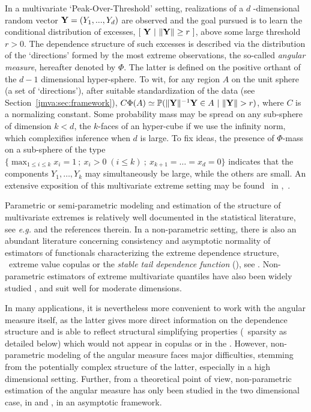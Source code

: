 In a multivariate `Peak-Over-Threshold' setting, realizations of a $d$ -dimensional random vector $\mathbf Y = (Y_1 ,..., Y_d)$ are observed and the goal pursued is to learn the conditional distribution of excesses, $\left[~ \mathbf Y ~|~ \|\mathbf Y\| \ge  r ~ \right]$, above some large threshold $ r>0$.
The dependence structure of such excesses is described via the
distribution of the ‘directions’ formed by the most extreme
observations, the  so-called \emph{angular measure}, hereafter denoted by $\Phi$.  The latter
is defined on the positive orthant of the $d-1$ dimensional
hyper-sphere. To wit, for any region $A$  on the unit sphere (a set
of `directions'), after suitable standardization of the data (see
 Section~\ref{jmva:sec:framework}), 
$C \Phi(A) \simeq \mathbb{P}(\|\mathbf Y\|^{-1} \mathbf Y \in A ~|~ \|\mathbf Y\| >r)$, where $C$ is a normalizing constant. 
Some probability mass may be spread on any sub-sphere of dimension $k
< d$, the $k$-faces of an hyper-cube if we use the infinity norm, which
complexifies inference when $d$ is large. To fix ideas, the presence of $\Phi$-mass on a
sub-sphere of the type $\{\max_{1\leq i\leq k} x_i = 1 ~;~   x_i >0 \;(i\le k) ~;~  x_{k+1} = \ldots = x_d = 0\}$ indicates that the components $Y_1,\ldots,Y_k$ may
simultaneously be large, while the others are small.
An extensive exposition of this multivariate extreme setting may be found \eg~in \cite{Resnick1987},~\cite{BGTS04}. 



Parametric or semi-parametric modeling and estimation of the structure of
multivariate extremes is relatively well documented in the statistical literature, see \emph{e.g.} \cite{coles1991modeling,fougeres2009models,cooley2010pairwise,sabourinNaveau2012} and the references therein. In a non-parametric setting, there is also an abundant literature concerning consistency and asymptotic normality of estimators of functionals characterizing the extreme dependence structure, \eg~extreme value copulas or the \emph{stable tail dependence function} (\stdf), see \cite{Segers12Bernoulli, Drees98, Embrechts2000, Einmahl2012, dHF06}. Non-parametric estimators of extreme multivariate quantiles have also been widely studied \citep{Beirlant2004, Gardes2008, Gardes2010, Girard2005, Girard2008, Daouia2011, Daouia2013}, and suit well for moderate dimensions.

In many applications, it is nevertheless more convenient to work with the angular measure itself, as the latter gives more direct information on the dependence structure and is able to reflect structural simplifying properties (\eg~sparsity as detailed below) which would not appear in copulas or in the \stdf.
However, non-parametric modeling of the angular measure faces major difficulties, stemming from the potentially complex structure of the latter, especially in a high dimensional setting.
Further, from a theoretical point of view, non-parametric estimation of the angular measure has only been studied in the two dimensional case, in \cite{Einmahl2001} and \cite{Einmahl2009}, in an asymptotic framework.

